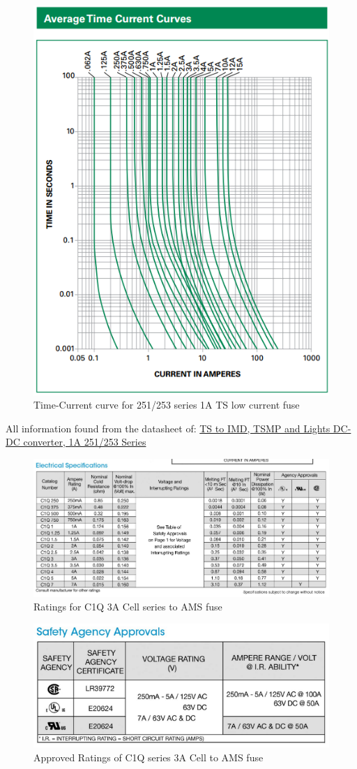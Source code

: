 \documentclass{article}
\begin{document}
{\begin{figure}[H]
    \centering
    \includegraphics[width = 0.6 \textwidth]{TSsmallmeltingtime}
    \caption{Time-Current curve for 251/253 series 1A TS low current fuse}
    \label{TSsmallcurve}
\end{figure}

All information found from the datasheet of:
\href{http://www.littelfuse.com/~/media/electronics/datasheets/fuses/littelfuse_fuse_251_253_datasheet.pdf.pdf}{TS to IMD, TSMP and Lights DC-DC converter, 1A 251/253 Series}

\begin{figure}[H]
    \centering
    \includegraphics[width = 0.6 \textwidth]{AMSfuseratings}
    \caption{Ratings for C1Q 3A Cell series to AMS fuse}
    \label{amsfuseratings}
\end{figure}

\begin{figure}[H]
    \centering
    \includegraphics[width = 0.6 \textwidth]{amsfuseapprovals}
    \caption{Approved Ratings of C1Q series 3A Cell to AMS fuse}
    \label{amsfuseapproval}
\end{figure}

}
\end{document}
